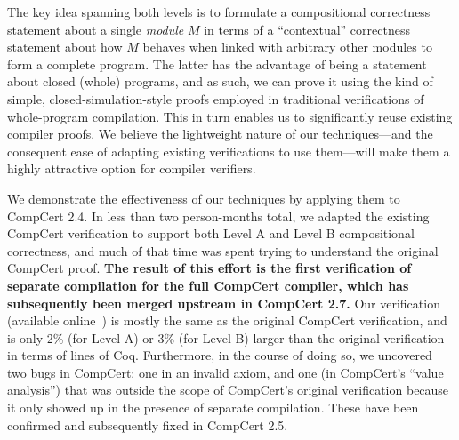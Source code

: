 The key idea spanning both levels is to formulate a compositional correctness statement about a
single \emph{module} $M$ in terms of a ``contextual'' correctness statement about how $M$ behaves
when linked with arbitrary other modules to form a complete program.  The latter has the advantage
of being a statement about closed (whole) programs, and as such, we can prove it using the kind of
simple, closed-simulation-style proofs employed in traditional verifications of whole-program
compilation.  This in turn enables us to significantly reuse existing compiler proofs.  We believe
the lightweight nature of our techniques---and the consequent ease of adapting existing
verifications to use them---will make them a highly attractive option for compiler verifiers.

We demonstrate the effectiveness of our techniques by applying them to CompCert 2.4.  In less than
two person-months total, we adapted the existing CompCert verification to support both Level A and
Level B compositional correctness, and much of that time was spent trying to understand the original
CompCert proof.  \textbf{The result of this effort is the first verification of separate compilation
  for the full CompCert compiler, which has subsequently been merged upstream in CompCert 2.7.}  Our
verification (available online~\cite{sepcompcert-website}) is mostly the same as the original
CompCert verification, and is only 2\% (for Level A) or 3\% (for Level B) larger than the original
verification in terms of lines of Coq.  Furthermore, in the course of doing so, we uncovered two
bugs in CompCert: one in an invalid axiom, and one (in CompCert's ``value analysis'') that was
outside the scope of CompCert's original verification because it only showed up in the presence of
separate compilation.  These have been confirmed and subsequently fixed in CompCert 2.5.




